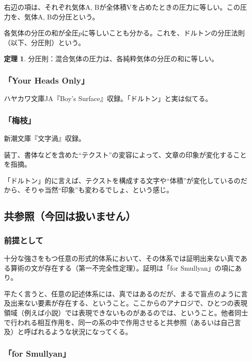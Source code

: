 \documentclass[10pt, a5paper, twoside]{jsarticle}
\theoremstyle{definition}
\newtheorem{thm}{定理}
\begin{document}
				右辺の項は、それぞれ気体A, Bが全体積Vを占めたときの圧力に等しい。この圧力を、気体A, Bの分圧という。

				各気体の分圧の和が全圧$ p $に等しいことも分かる。これを、ドルトンの分圧法則（以下、分圧則）という。

			\begin{thm}

				分圧則：混合気体の圧力は、各純粋気体の分圧の和に等しい。

			\end{thm}

			\subsubsection{「Your Heads Only」}

				ハヤカワ文庫JA『Boy's Surface』収録。「ドルトン」と実は似てる。

			\subsubsection{「梅枝」}

				新潮文庫『文字渦』収録。

				装丁、書体などを含めた“テクスト”の変容によって、文章の印象が変化することを指摘。

				「ドルトン」的に言えば、テクストを構成する文字や“体積”が変化しているのだから、そりゃ当然“印象”も変わるでしょ、という感じ。

		\subsection{共参照（今回は扱いません）}

			\subsubsection*{前提として}

				十分な強さをもつ任意の形式的体系において、その体系では証明出来ない真である算術の文が存在する（第一不完全性定理）。証明は「for Smullyan」の項にあり。

				平たく言うと、任意の記述体系には、真ではあるのだが、まるで盲点のように言及出来ない要素が存在する、ということ。ここからのアナロジで、ひとつの表現領域（例えば小説）では表現できないものがあるのでは、ということ。他者同士で行われる相互作用を、同一の系の中で作用させると共参照（あるいは自己言及）と呼ばれるような状況になってくる。

			\subsubsection{「for Smullyan」}
\end{document}
